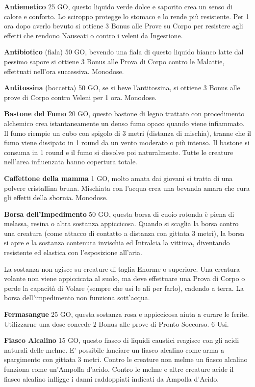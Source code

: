 \documentclass[12pt,a4paper,twoside,openany]{book}
\begin{document}
\begin{multicols}{2}
\textbf{Antiemetico} 25 GO,  questo liquido verde dolce e saporito crea un senso di calore e conforto. Lo sciroppo protegge lo stomaco e lo rende più resistente. Per 1 ora dopo averlo bevuto si ottiene 3 Bonus alle Prove su Corpo per resistere agli effetti che rendono Nauseati o contro i veleni da Ingestione.

\textbf{Antibiotico} (fiala) 50 GO, bevendo una fiala di questo liquido bianco latte dal pessimo sapore si ottiene 3 Bonus alle Prova di Corpo contro le Malattie, effettuati nell'ora successiva. Monodose. 

\textbf{Antitossina} (boccetta) 50 GO, se si beve l'antitossina, si ottiene 3 Bonus alle prove di Corpo contro Veleni per 1 ora. Monodose. 

\textbf{Bastone del Fumo} 20 GO, questo bastone di legno trattato con procedimento alchemico crea istantaneamente un denso fumo opaco quando viene infiammato. Il fumo riempie un cubo con spigolo di 3 metri (distanza di mischia), tranne che il fumo viene dissipato in 1 round da un vento moderato o più intenso. Il bastone si consuma in 1 round e il fumo si dissolve poi naturalmente. Tutte le creature nell'area influenzata hanno copertura totale.

\textbf{Caffettone della mamma} 1 GO, molto amata dai giovani si tratta di una polvere cristallina bruna. Mischiata con l'acqua crea una bevanda amara che cura gli effetti della sbornia. Monodose.

\textbf{Borsa dell'Impedimento} 50 GO, questa borsa di cuoio rotonda è piena di melassa, resina o altra sostanza appiccicosa. Quando si scaglia la borsa contro una creatura (come attacco di contatto a distanza con gittata 3 metri), la borsa si apre e la sostanza contenuta invischia ed Intralcia la vittima, diventando resistente ed elastica con l'esposizione all'aria.

La sostanza non agisce su creature di taglia Enorme o superiore. Una creatura volante non viene appiccicata al suolo, ma deve effettuare una Prova di Corpo o perde la capacità di Volare (sempre che usi le ali per farlo), cadendo a terra. La borsa dell'impedimento non funziona sott'acqua.

\textbf{Fermasangue} 25 GO, questa sostanza rosa e appiccicosa aiuta a curare le ferite. Utilizzarne una dose concede 2 Bonus alle prove di Pronto Soccorso. 6 Usi.

\textbf{Fiasco Alcalino} 15 GO, questo fiasco di liquidi caustici reagisce con gli acidi naturali delle melme. E' possibile lanciare un fiasco alcalino come arma a spargimento con gittata 3 metri. Contro le creature non melme un fiasco alcalino funziona come un'Ampolla d'acido. Contro le melme e altre creature acide il fiasco alcalino infligge i danni raddoppiati indicati da Ampolla d'Acido. 


\end{multicols}
\end{document}
